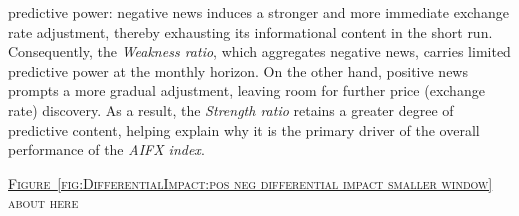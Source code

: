\documentclass[12pt,oneside,letter]{article}
\newcommand*{\myfig}[1]{\hyperref[{#1}]{Figure~\ref*{#1}}}
\begin{document}
predictive power: negative news induces a stronger and more immediate exchange rate adjustment, thereby exhausting its informational content in the short run. Consequently, the \textit{Weakness ratio}, which aggregates negative news, carries limited predictive power at the monthly horizon. On the other hand, positive news prompts a more gradual adjustment, leaving room for further price (exchange rate) discovery. As a result, the \textit{Strength ratio} retains a greater degree of predictive content, helping explain why it is the primary driver of the overall performance of the \textit{AIFX index}.
		\begin{center}
			\textsc{\myfig{fig:DifferentialImpact:pos neg differential impact smaller window} about here} \vspace{0cm}
		\end{center} 
\end{document}
